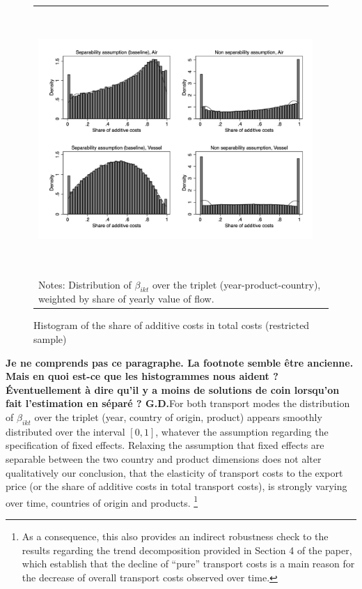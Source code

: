 \documentclass[11pt,twoside, authoryear]{elsarticle}
\begin{document}
\begin{figure}[htbp]
\caption{Histogram of the share of additive costs in total costs (restricted sample)}
\label{fig:histogram_beta_robustness}
\begin{center}
\begin{tabular}{cc}
\includegraphics[width=14cm, height=10cm]{Etude_beta_pond.jpg}\\
\multicolumn{2}{l}{{\footnotesize Notes: Distribution of $\beta_{ikt}$ over the triplet (year-product-country), weighted by share of yearly value of flow.}}\\
\end{tabular}
\end{center}
\end{figure}

\textbf{Je ne comprends pas ce paragraphe. La footnote semble être ancienne. Mais en quoi est-ce que les histogrammes nous aident ? Éventuellement à dire qu’il y a moins de solutions de coin lorsqu’on fait l’estimation en séparé ? G.D.}For both transport modes the distribution of $\beta_{ikt}$ over the triplet (year, country of origin, product) appears smoothly distributed over the interval $[0,1]$, whatever the assumption regarding the specification of fixed effects.
Relaxing the assumption that fixed effects are separable between the two country and product dimensions does not alter qualitatively our conclusion, that the elasticity of transport costs to the export price (or the share of additive costs in total transport costs), is strongly varying over time, countries of origin and products.
\footnote{As a consequence, this also provides an indirect robustness check to the results regarding the trend decomposition provided in Section 4 of the paper, which establish that the decline of ``pure'' transport costs is a main reason for the decrease of overall transport costs observed over time.}
\end{document}
